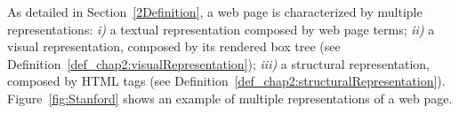 
As detailed in Section~\ref{2Definition}, a web page is characterized by multiple representations: \emph{i)} a textual representation composed by web page terms; \emph{ii)} a visual representation, composed by its rendered box tree (see Definition~\ref{def_chap2:visualRepresentation}); \emph{iii)} a structural representation, composed by HTML tags (see Definition~\ref{def_chap2:structuralRepresentation}). %
Figure~\ref{fig:Stanford} shows an example of multiple representations of a web page.

